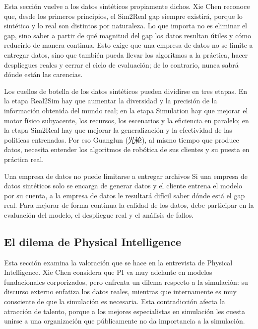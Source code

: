 Esta sección vuelve a los datos sintéticos propiamente dichos. Xie Chen reconoce que, desde los primeros principios, el Sim2Real gap siempre existirá, porque lo sintético y lo real son distintos por naturaleza. Lo que importa no es eliminar el gap, sino saber a partir de qué magnitud del gap los datos resultan útiles y cómo reducirlo de manera continua. Esto exige que una empresa de datos no se limite a entregar datos, sino que también pueda llevar los algoritmos a la práctica, hacer despliegues reales y cerrar el ciclo de evaluación; de lo contrario, nunca sabrá dónde están las carencias.

Los cuellos de botella de los datos sintéticos pueden dividirse en tres etapas. En la etapa Real2Sim hay que aumentar la diversidad y la precisión de la información obtenida del mundo real; en la etapa Simulation hay que mejorar el motor físico subyacente, los recursos, los escenarios y la eficiencia en paralelo; en la etapa Sim2Real hay que mejorar la generalización y la efectividad de las políticas entrenadas. Por eso Guanglun (光轮), al mismo tiempo que produce datos, necesita entender los algoritmos de robótica de sus clientes y su puesta en práctica real.

\begin{warningbox}{Una empresa de datos no puede limitarse a entregar archivos}
Si una empresa de datos sintéticos solo se encarga de generar datos y el cliente entrena el modelo por su cuenta, a la empresa de datos le resultará difícil saber dónde está el gap real. Para mejorar de forma continua la calidad de los datos, debe participar en la evaluación del modelo, el despliegue real y el análisis de fallos.
\end{warningbox}

\subsection{El dilema de Physical Intelligence}

Esta sección examina la valoración que se hace en la entrevista de Physical Intelligence. Xie Chen considera que PI va muy adelante en modelos fundacionales corporizados, pero enfrenta un dilema respecto a la simulación: su discurso externo enfatiza los datos reales, mientras que internamente es muy consciente de que la simulación es necesaria. Esta contradicción afecta la atracción de talento, porque a los mejores especialistas en simulación les cuesta unirse a una organización que públicamente no da importancia a la simulación.

